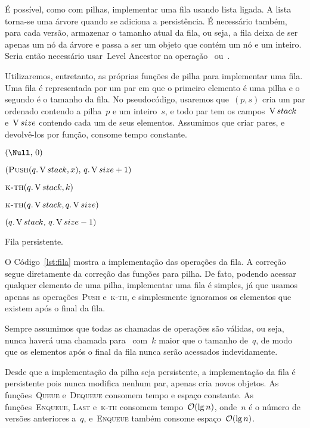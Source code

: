 \documentclass[main.tex]{subfiles}
\begin{document}
É possível, como com pilhas, implementar uma fila usando lista ligada. A lista torna-se uma árvore quando se adiciona a persistência. É necessário também, para cada versão, armazenar o tamanho atual da fila, ou seja, a fila deixa de ser apenas um nó da árvore e passa a ser um objeto que contém um nó e um inteiro. Seria então necessário usar~Level Ancestor na operação~ ou~.

Utilizaremos, entretanto, as próprias funções de pilha para implementar uma fila. Uma fila é representada por um par em que o primeiro elemento é uma pilha e o segundo é o tamanho da fila. No pseudocódigo, usaremos que~$(p,s)$ cria um par ordenado contendo a pilha~$p$ e um inteiro~$s$, e todo par tem os campos~$\operatorname{V}{stack}$ e~$\operatorname{V}{size}$ contendo cada um de seus elementos.
Assumimos que criar pares, e devolvê-los por função, consome tempo constante.


\begin{algorithm}
\begin{algorithmic}[1]
    \State \Return $(\Null,\,0)$
\EndFunction

    \State \Return $(\Call{Push}{q.\V{stack}, x},\,q.\V{size} + 1)$
\EndFunction

    \State \Return $\Call{k-th}{q.\V{stack}, k}$ 
\EndFunction

    \State \Return $\Call{k-th}{q.\V{stack}, q.\V{size}}$ 
\EndFunction

    \State \Return $(q.\operatorname{V}{stack},\,q.\operatorname{V}{size} - 1)$
\EndFunction

\end{algorithmic}
\caption{Fila persistente.} \label{lst:eila}
\end{algorithm}

O Código~\ref{lst:fila} mostra a implementação das operações da fila. A correção segue diretamente da correção das funções para pilha. De fato, podendo acessar qualquer elemento de uma pilha, implementar uma fila é simples, já que usamos apenas as operações~\textsc{Push} e~\textsc{k-th}, e simplesmente ignoramos os elementos que existem após o final da fila.

Sempre assumimos que todas as chamadas de operações são válidas, ou seja, nunca haverá uma chamada para~ com~$k$ maior que o tamanho de~$q$, de modo que os elementos após o final da fila nunca serão acessados indevidamente.

Desde que a implementação da pilha seja persistente, a implementação da fila é persistente pois nunca modifica nenhum par, apenas cria novos objetos. As funções~\textsc{Queue} e~\textsc{Dequeue} consomem tempo e espaço constante. As funções~\textsc{Enqueue}, \textsc{Last} e~\textsc{k-th} consomem tempo~$\mathcal{O}(\lg n)$, onde~$n$ é o número de versões anteriores a~$q$, e~\textsc{Enqueue} também consome espaço~$\mathcal{O}(\lg n)$.
\end{document}
